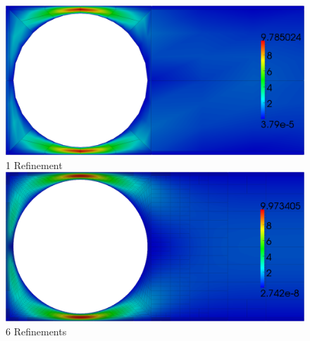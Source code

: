 \documentclass{beamer}
\begin{document}
\begin{frame}
\begin{columns}
\begin{column}{0.49\textwidth}
{\begin{figure}
Nonconservative
\end{figure}
\end{column}
\begin{column}{0.49\textwidth}
\begin{figure}
\centering
\includegraphics[width=1.0\textwidth]{StokesCylinder/umag9_C1.png}\\
\vspace{-1ex}
{\scriptsize 1 Refinement}\\
\vspace{1ex}
\includegraphics[width=1.0\textwidth]{StokesCylinder/umag9_C6.png}
\vspace{-1ex}
{\scriptsize 6 Refinements}
\vspace{1ex}


\end{figure}
\end{column}
\end{columns}
\end{frame}
\end{document}
